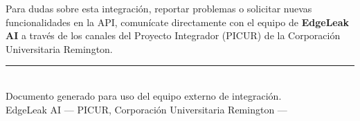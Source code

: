 \documentclass[12pt, a4paper]{article}
\begin{document}
Para dudas sobre esta integración, reportar problemas o solicitar nuevas
funcionalidades en la API, comunícate directamente con el equipo de
\textbf{EdgeLeak AI} a través de los canales del Proyecto Integrador (PICUR)
de la Corporación Universitaria Remington.

\vspace{1cm}
\begin{center}
  {\color{edgeblue}\rule{0.5\linewidth}{0.8pt}}\\[0.3cm]
  {\color{edgegray}\small Documento generado para uso del equipo externo de integración.\\
  EdgeLeak AI — PICUR, Corporación Universitaria Remington — \the\year}
\end{center}
\end{document}
